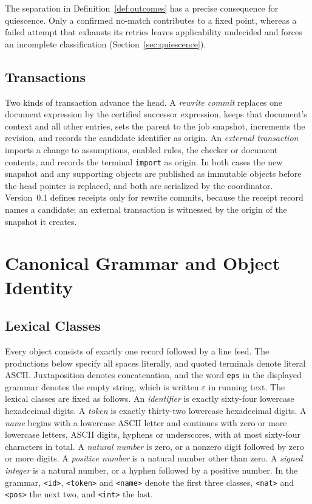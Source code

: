 \documentclass[11pt,a4paper]{article}
\theoremstyle{plain}
\theoremstyle{definition}
\theoremstyle{remark}
\theoremstyle{definition}
\newcommand{\code}[1]{\texttt{#1}}
\begin{document}
The separation in Definition~\ref{def:outcomes} has a precise consequence for quiescence. Only a confirmed no-match contributes to a fixed point, whereas a failed attempt that exhausts its retries leaves applicability undecided and forces an incomplete classification (Section~\ref{sec:quiescence}).

\subsection{Transactions}

Two kinds of transaction advance the head. A \emph{rewrite commit} replaces one document expression by the certified successor expression, keeps that document's context and all other entries, sets the parent to the job snapshot, increments the revision, and records the candidate identifier as origin. An \emph{external transaction} imports a change to assumptions, enabled rules, the checker or document contents, and records the terminal \code{import} as origin. In both cases the new snapshot and any supporting objects are published as immutable objects before the head pointer is replaced, and both are serialized by the coordinator. Version~0.1 defines receipts only for rewrite commits, because the receipt record names a candidate; an external transaction is witnessed by the origin of the snapshot it creates.

\section{Canonical Grammar and Object Identity}
\label{sec:grammar}

\subsection{Lexical Classes}

Every object consists of exactly one record followed by a line feed. The productions below specify all spaces literally, and quoted terminals denote literal ASCII. Juxtaposition denotes concatenation, and the word \code{eps} in the displayed grammar denotes the empty string, which is written $\varepsilon$ in running text. The lexical classes are fixed as follows. An \emph{identifier} is exactly sixty-four lowercase hexadecimal digits. A \emph{token} is exactly thirty-two lowercase hexadecimal digits. A \emph{name} begins with a lowercase ASCII letter and continues with zero or more lowercase letters, ASCII digits, hyphens or underscores, with at most sixty-four characters in total. A \emph{natural number} is zero, or a nonzero digit followed by zero or more digits. A \emph{positive number} is a natural number other than zero. A \emph{signed integer} is a natural number, or a hyphen followed by a positive number. In the grammar, \code{<id>}, \code{<token>} and \code{<name>} denote the first three classes, \code{<nat>} and \code{<pos>} the next two, and \code{<int>} the last.
\end{document}
